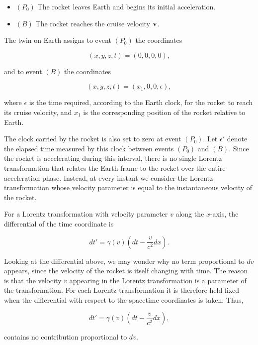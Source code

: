 \documentclass[12pt]{article}
\begin{document}
\begin{itemize}
  \item  $(P_0)$ The rocket leaves Earth and begins its initial acceleration.

  \item  $(B)$ The rocket reaches the cruise velocity $\vb v$.
\end{itemize}

The twin on Earth assigns to event $(P_0)$ the coordinates

\[
  (x,y,z,t)=(0,0,0,0),
\]

and to event $(B)$ the coordinates

\[
  (x,y,z,t)=(x_1,0,0,\epsilon),
\]

where $\epsilon$ is the time required, according to the Earth clock, for the rocket
to reach its cruise velocity, and $x_1$ is the corresponding position of the rocket
relative to Earth. \par

The clock carried by the rocket is also set to zero at event $(P_0)$. Let $\epsilon'$
denote the elapsed time measured by this clock between events $(P_0)$ and $(B)$. Since
the rocket is accelerating during this interval, there is no single Lorentz transformation
that relates the Earth frame to the rocket over the entire acceleration phase. Instead,
at every instant we consider the Lorentz transformation whose velocity parameter is equal
to the instantaneous velocity of the rocket. \par

For a Lorentz transformation with velocity parameter $v$ along the $x$-axis, the
differential of the time coordinate is

\begin{equation}
  dt'
  =
  \gamma(v)
  \left(
    dt-\frac{v}{c^2}dx
  \right).
  \label{eq:Lorentz_transformation_differential_time}
\end{equation}

Looking at the differential above, we may wonder why no term proportional to $dv$
appears, since the velocity of the rocket is itself changing with time. The reason is
that the velocity $v$ appearing in the Lorentz transformation is a parameter of the
transformation. For each Lorentz transformation it is therefore held fixed when the
differential with respect to the spacetime coordinates is taken. Thus,

\[
  dt'
  =
  \gamma(v)
  \left(
    dt-\frac{v}{c^2}dx
  \right),
\]

contains no contribution proportional to $dv$. \par
\end{document}
